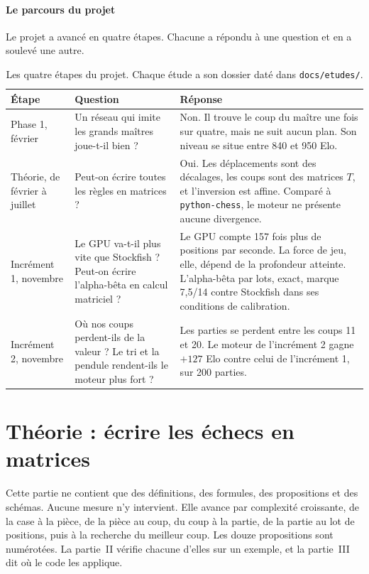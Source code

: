 \documentclass[11pt,a4paper]{article}
\newcommand{\code}[1]{\texttt{#1}}
\newcounter{calcul}
\theoremstyle{plain}
\begin{document}
\subsection*{Le parcours du projet}
Le projet a avancé en quatre étapes. Chacune a répondu à une question et en a soulevé une autre.

\begin{table}[H]
\centering\small
\begin{tabular}{>{\raggedright\arraybackslash}p{2.4cm}>{\raggedright\arraybackslash}p{5.1cm}>{\raggedright\arraybackslash}p{7.2cm}}
\toprule
Étape & Question & Réponse\\
\midrule
Phase 1, février & Un réseau qui imite les grands maîtres joue-t-il bien ? &
Non. Il trouve le coup du maître une fois sur quatre, mais ne suit aucun plan. Son niveau se situe
entre 840 et 950 Elo.\\
Théorie, de février à juillet & Peut-on écrire toutes les règles en matrices ? &
Oui. Les déplacements sont des décalages, les coups sont des matrices $T$, et l'inversion est
affine. Comparé à \code{python-chess}, le moteur ne présente aucune divergence.\\
Incrément 1, novembre & Le GPU va-t-il plus vite que Stockfish ? Peut-on écrire l'alpha-bêta en
calcul matriciel ? &
Le GPU compte 157 fois plus de positions par seconde. La force de jeu, elle, dépend de la
profondeur atteinte. L'alpha-bêta par lots, exact, marque 7,5/14 contre Stockfish dans ses
conditions de calibration.\\
Incrément 2, novembre & Où nos coups perdent-ils de la valeur ? Le tri et la pendule rendent-ils
le moteur plus fort ? &
Les parties se perdent entre les coups 11 et 20. Le moteur de l'incrément 2 gagne $+127$ Elo
contre celui de l'incrément 1, sur 200 parties.\\
\bottomrule
\end{tabular}
\caption{Les quatre étapes du projet. Chaque étude a son dossier daté dans \code{docs/etudes/}.}
\end{table}

\clearpage
\part{Théorie : écrire les échecs en matrices}

Cette partie ne contient que des définitions, des formules, des propositions et des schémas.
Aucune mesure n'y intervient. Elle avance par complexité croissante, de la case à la pièce, de la
pièce au coup, du coup à la partie, de la partie au lot de positions, puis à la recherche du
meilleur coup. Les douze propositions sont numérotées. La partie~II vérifie chacune d'elles sur
un exemple, et la partie~III dit où le code les applique.
\end{document}
